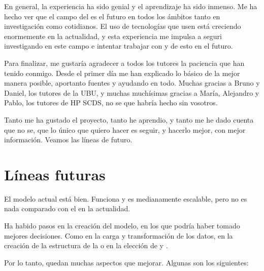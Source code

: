 En general, la experiencia ha sido genial y el aprendizaje ha sido inmenso. Me ha hecho ver que el campo del  es el futuro en todos los ámbitos tanto en investigación como cotidianos. El uso de tecnologías que usen  está creciendo enormemente en la actualidad, y esta experiencia me impulsa a seguri investigando en este campo e intentar trabajar con y de esto en el futuro.

Para finalizar, me gustaría agradecer a todos los tutores la paciencia que han tenido conmigo. Desde el primer día me han explicado lo básico de la mejor manera posible, aportanto fuentes y ayudando en todo.
Muchas gracias a Bruno y Daniel, los tutores de la UBU, y muchas muchísimas gracias a María, Alejandro y Pablo, los tutores de HP SCDS, no se que habría hecho sin vosotros.

Tanto me ha gustado el proyecto, tanto he aprendio, y tanto me he dado cuenta que no se, que lo único que quiero hacer es seguir, y hacerlo mejor, con mejor información. Veamos las líneas de futuro.

\section{Líneas futuras}

El modelo actual está bien. Funciona y es medianamente escalable, pero no es nada comparado con el    en la actualidad.

Ha habido pasos en la creación del modelo, en los que podría haber tomado mejores decisiones. Como en la carga y transformación de los datos, en la creación de la estructura de la  o en la elección de  y .

Por lo tanto, quedan muchas aspectos que mejorar. Algunas son los siguientes:

